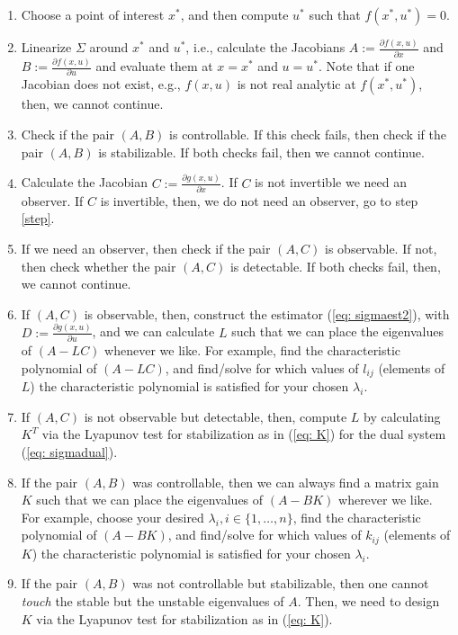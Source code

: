 \documentclass[11pt,a4paper,titlepage]{article}
\begin{document}
\begin{enumerate}
	\item Choose a point of interest $x^*$, and then compute $u^*$ such that $f(x^*,u^*) = 0$.
	\item Linearize $\Sigma$ around $x^*$ and $u^*$, i.e., calculate the Jacobians $A:=\frac{\partial f(x,u)}{\partial x}$ and $B:=\frac{\partial f(x,u)}{\partial u}$ and evaluate them at $x=x^*$ and $u=u^*$. Note that if one Jacobian does not exist, e.g., $f(x,u)$ is not real analytic at $f(x^*,u^*)$, then, we cannot continue. %
\item Check if the pair $(A,B)$ is controllable. If this check fails, then check if the pair $(A,B)$ is stabilizable. If both checks fail, then we cannot continue.
\item Calculate the Jacobian $C:=\frac{\partial g(x,u)}{\partial x}$. If $C$ is not invertible we need an observer. If $C$ is invertible, then, we do not need an observer, go to step \ref{step}.
\item If we need an observer, then check if the pair $(A,C)$ is observable. If not, then check whether the pair $(A,C)$ is detectable. If both checks fail, then, we cannot continue.
\item If $(A,C)$ is observable, then, construct the estimator (\ref{eq: sigmaest2}), with $D:=\frac{\partial g(x,u)}{\partial u}$, and we can calculate $L$ such that we can place the eigenvalues of $(A-LC)$ whenever we like. For example, find the characteristic polynomial of $(A-LC)$, and find/solve for which values of $l_{ij}$ (elements of $L$) the characteristic polynomial is satisfied for your chosen $\lambda_i$.
\item If $(A,C)$ is not observable but detectable, then, compute $L$ by calculating $K^T$ via the Lyapunov test for stabilization as in (\ref{eq: K}) for the dual system (\ref{eq: sigmadual}).

\item \label{step} If the pair $(A,B)$ was controllable, then we can always find a matrix gain $K$ such that we can place the eigenvalues of $(A-BK)$ wherever we like. For example, choose your desired $\lambda_i, i\in\{1,\dots,n\}$, find the characteristic polynomial of $(A-BK)$, and find/solve for which values of $k_{ij}$ (elements of $K$) the characteristic polynomial is satisfied for your chosen $\lambda_i$.
\item If the pair $(A,B)$ was not controllable but stabilizable, then one cannot \emph{touch} the stable but the unstable eigenvalues of $A$. Then, we need to design $K$ via the Lyapunov test for stabilization as in (\ref{eq: K}).


\end{enumerate}
\end{document}
